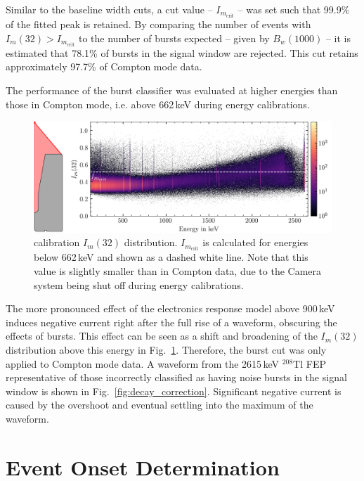 Similar to the baseline width cuts, a cut value -- $I_{m_\text{crit}}$ -- was set such that 99.9\% of the fitted peak is retained. By comparing the number of events with $I_m(32) > I_{m_\text{crit}}$ to the number of bursts expected -- given by $B_w(1000)$ -- it is estimated that 78.1\% of bursts in the signal window are rejected. This cut retains approximately 97.7\% of Compton mode data.

The performance of the burst classifier was evaluated at higher energies than those in Compton mode, i.e. above 662\,keV during \ThS{} energy calibrations. 
\begin{figure}[htb]
    \centering
    \includegraphics[width=6in]{figs/param/Im32_spectrum_6_9in.png}
    \caption{\ThS{} calibration $I_m(32)$ distribution. $I_{m_\text{crit}}$ is calculated for energies below 662\,keV and shown as a dashed white line. Note that this value is slightly smaller than in Compton data, due to the Camera system being shut off during \ThS{} energy calibrations.}
    \label{fig:current_min_spectrum}
\end{figure}
The more pronounced effect of the electronics response model above 900\,keV induces negative current right after the full rise of a waveform, obscuring the effects of bursts. This effect can be seen as a shift and broadening of the $I_m(32)$ distribution above this energy in Fig.~\ref{fig:current_min_spectrum}. Therefore, the burst cut was only applied to Compton mode data. A waveform from the 2615\,keV $^{208}$Tl FEP representative of those incorrectly classified as having noise bursts in the signal window is shown in Fig.~\ref{fig:decay_correction}. Significant negative current is caused by the overshoot and eventual settling into the maximum of the waveform.

\section{Event Onset Determination}\label{sec:t0}

